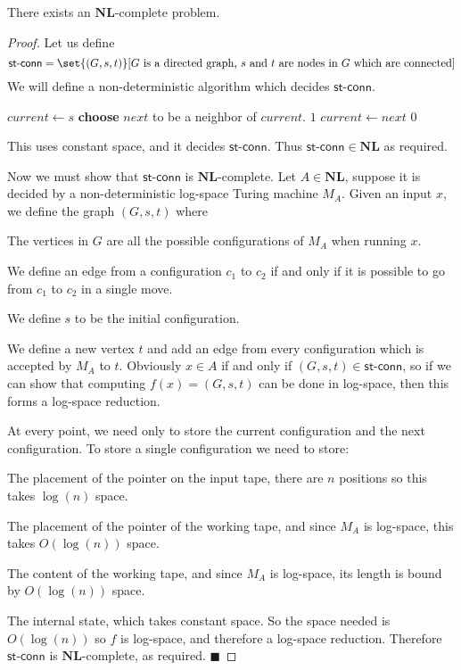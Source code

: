 \documentclass[10pt]{article}
\def\stconn{\textsf{st-conn}}
\def\NL{\mathbf{NL}}
\def\qed{%
    \ifmmode%
        \eqno\blacksquare%
    \else%
        \hskip1cm\allowbreak\hbox{}\nobreak\hfill$\blacksquare$%
    \fi%
}
\begin{document}
\begin{prop*}

    There exists an $\NL$-complete problem.

\end{prop*}

\begin{proof}

    Let us define
    \[ \stconn = \set{(G,s,t)}[\text{$G$ is a directed graph, $s$ and $t$ are nodes in $G$ which are connected}] \]
    We will define a non-deterministic algorithm which decides $\stconn$.

    \algorithm
            \State $\mathit{current}\gets s$
                \State \textbf{choose} $\textit{next}$ to be a neighbor of $\mathit{current}$.
                 \Return $1$
                \State $\mathit{current}\gets\mathit{next}$
            \EndRepeat
            \State\Return $0$
        \EndFunc
    \ealgorithm

    This uses constant space, and it decides $\stconn$.
    Thus $\stconn\in\NL$ as required.

    Now we must show that $\stconn$ is $\NL$-complete.
    Let $A\in\NL$, suppose it is decided by a non-deterministic log-space Turing machine $M_A$.
    Given an input $x$, we define the graph $(G,s,t)$ where
    \benum
        \item The vertices in $G$ are all the possible configurations of $M_A$ when running $x$.
        \item We define an edge from a configuration $c_1$ to $c_2$ if and only if it is possible to go from $c_1$ to $c_2$ in a single move.
        \item We define $s$ to be the initial configuration.
        \item We define a new vertex $t$ and add an edge from every configuration which is accepted by $M_A$ to $t$.
    \eenum
    Obviously $x\in A$ if and only if $(G,s,t)\in\stconn$, so if we can show that computing $f(x)=(G,s,t)$ can be done in log-space, then this forms a log-space reduction.

    At every point, we need only to store the current configuration and the next configuration.
    To store a single configuration we need to store:
    \benum
        \item The placement of the pointer on the input tape, there are $n$ positions so this takes $\log(n)$ space.
        \item The placement of the pointer of the working tape, and since $M_A$ is log-space, this takes $O(\log(n))$ space.
        \item The content of the working tape, and since $M_A$ is log-space, its length is bound by $O(\log(n))$ space.
        \item The internal state, which takes constant space.
    \eenum
    So the space needed is $O(\log(n))$ so $f$ is log-space, and therefore a log-space reduction.
    Therefore $\stconn$ is $\NL$-complete, as required.
    \qed

\end{proof}
\end{document}
